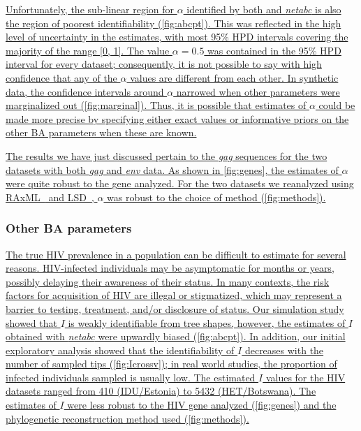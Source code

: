 \documentclass[12pt]{article}\usepackage[]{graphicx}\usepackage[]{color}
\let\mref\cref
\renewcommand{\cref}[1]{\mbox{\mref{#1}}}
\newcommand{\add}[1]{\color{blue} \uline{#1} \color{black}}
\begin{document}
\add{Unfortunately, the sub-linear region for $\alpha$ identified by both
\textcite{de2007preferential} and \textit{netabc} is also the region of
poorest identifiability (\cref{fig:abcpt}). This was reflected in the high
level of uncertainty in the estimates, with most 95\% HPD intervals covering
the majority of the range [0, 1]. The value $\alpha = 0.5$ was contained in the
95\% HPD interval for every dataset; consequently, it is not possible to say
with high confidence that any of the $\alpha$ values are different from each
other. In synthetic data, the confidence intervals around $\alpha$ narrowed
when other parameters were marginalized out (\cref{fig:marginal}). Thus, it is
possible that estimates of $\alpha$ could be made more precise by specifying
either exact values or informative priors on the other BA parameters when these
are known.}

\add{The results we have just discussed pertain to the \textit{gag} sequences
for the two datasets with both \textit{gag} and \textit{env} data. As shown in
\cref{fig:genes}, the estimates of $\alpha$ were quite robust to the gene
analyzed. For the two datasets we reanalyzed using
RAxML~\autocite{stamatakis2014raxml} and LSD~\autocite{to2016fast}, $\alpha$
was robust to the choice of method (\cref{fig:methods}).}

\subsubsection*{Other BA parameters}



\add{The true HIV prevalence in a population can be difficult to estimate for
several reasons. HIV-infected individuals may be asymptomatic for months or
years, possibly delaying their awareness of their status. In many contexts, the
risk factors for acquisition of HIV are illegal or stigmatized, which may
represent a barrier to testing, treatment, and/or disclosure of status.
Our simulation study showed that $I$ is weakly identifiable from tree shapes,
however, the estimates of $I$ obtained with \textit{netabc} were upwardly
biased (\cref{fig:abcpt}). In addition, our initial exploratory analysis showed
that the identifiability of $I$ decreases with the number of sampled tips
(\cref{fig:Icrossv}); in real world studies, the proportion of infected
individuals sampled is usually low. The estimated $I$ values for the HIV
datasets ranged from
    410
    (IDU/Estonia)
to
    5432
    (HET/Botswana).
The estimates of $I$ were less robust to the HIV gene analyzed
(\cref{fig:genes}) and the phylogenetic reconstruction method used
(\cref{fig:methods}).}
\end{document}
